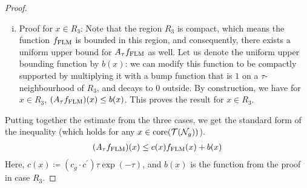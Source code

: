 \begin{proof}
\begin{enumerate}[(i)]
    Let $z_{i, \mathrm{im}}$ be the imaginary part of the $i$\textsuperscript{th} copy of $\mathbb{H}$ in $\prod_{i=1}^k \mathbb{H}_i$.
    The function $\flm$ on $\prod_{i=1}^k \mathbb{H}_i$ is given by the following formula.
    \begin{align*}
      \flm(x) = \max_{i} \sqrt{z_{(i, \mathrm{im})}}
    \end{align*}
    Since averaging this function over a product of balls is somewhat tedious, we relate it to a different function $\flm^{\prime}$ that is easier to average.
    \begin{align*}
      \flm^{\prime}(x) \coloneqq \sum_i \sqrt{z_{(i, \mathrm{im})}}
    \end{align*}
    These two functions are equal, up to a constant multiplicative error.
    \begin{align*}
      \frac{\flm^{\prime}(x)}{c_g} \leq \flm(x) \leq \flm^{\prime}(x)
    \end{align*}
    This means we can prove the averaging estimate for $\flm^{\prime}$, and the same estimate will hold for $\flm$, with a slightly worse multiplicative constant.

    Furthermore, since $z_{i, \mathrm{im}}$ is constant along balls in $\mathbb{H}_j$ for $j \neq i$, it suffices to average just each term of the sum in the corresponding $\mathbb{H}_i$.
    We do so, using the same estimate from the proof in the $R_1$ case.
    \begin{align*}
      (A_{\tau}\flm^{\prime})(x) \leq c^{\prime} \tau \exp(-\tau) \flm^{\prime}(x)
    \end{align*}
    Replacing $\flm^{\prime}$ with $\flm$ gives us the inequality we want, and proves the result in this case.
    \begin{align*}
      (A_{\tau}\flm)(x) \leq  (c_g \cdot c^{\prime}) \tau \exp(-\tau) \flm(x)
    \end{align*}
  \item Proof for $x \in R_3$: Note that the region $R_3$ is compact, which means the function $\flm$ is bounded in this region, and consequently, there exists a uniform upper bound for $A_\tau f_{\mathrm{FLM}}$ as well.
    Let us denote the uniform upper bounding function by $b(x)$: we can modify this function to be compactly supported by multiplying it with a bump function that is $1$ on a $\tau$-neighbourhood of $R_3$, and decays to $0$ outside.
    By construction, we have for $x \in R_3$, $(A_{\tau}f_{\mathrm{FLM}})(x) \leq b(x)$.
    This proves the result for $x \in R_3$.
  \end{enumerate}
  Putting together the estimate from the three cases, we get the standard form of the inequality (which holds for any $x \in \mathrm{core}(\mathcal{T}(\mathcal{N}_g))$).
  \begin{align*}
    (A_{\tau} f_{\mathrm{FLM}})(x) \leq c(x) f_{\mathrm{FLM}}(x) + b(x)
  \end{align*}
  Here, $c(x) \coloneqq (c_g \cdot c^{\prime}) \tau \exp(-\tau)$, and $b(x)$ is the function from the proof in case $R_3$.
\end{proof}

